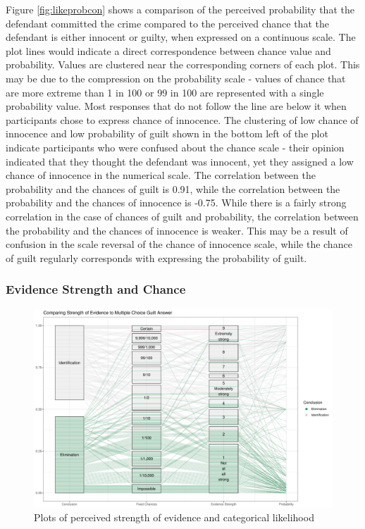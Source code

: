 \documentclass[print]{nuthesis}
\begin{document}
Figure \ref{fig:likeprobcon} shows a comparison of the perceived probability that the defendant committed the crime compared to the perceived chance that the defendant is either innocent or guilty, when expressed on a continuous scale.
The plot lines would indicate a direct correspondence between chance value and probability.
Values are clustered near the corresponding corners of each plot.
This may be due to the compression on the probability scale - values of chance that are more extreme than 1 in 100 or 99 in 100 are represented with a single probability value.
Most responses that do not follow the line are below it when participants chose to express chance of innocence.
The clustering of low chance of innocence and low probability of guilt shown in the bottom left of the plot indicate participants who were confused about the chance scale - their opinion indicated that they thought the defendant was innocent, yet they assigned a low chance of innocence in the numerical scale.
The correlation between the probability and the chances of guilt is 0.91,
while the correlation between the probability and the chances of innocence is -0.75.
While there is a fairly strong correlation in the case of chances of guilt and probability, the correlation between the probability and the chances of innocence is weaker.
This may be a result of confusion in the scale reversal of the chance of innocence scale, while the chance of guilt regularly corresponds with expressing the probability of guilt.

\hypertarget{evidence-strength-and-chance}{%
\subsubsection{Evidence Strength and Chance}\label{evidence-strength-and-chance}}

\begin{figure}

{\centering \includegraphics[width=\linewidth]{thesis_files/figure-latex/coordstrcat-1} 

}

\caption{Plots of perceived strength of evidence and categorical likelihood}\label{fig:coordstrcat}
\end{figure}
\end{document}
